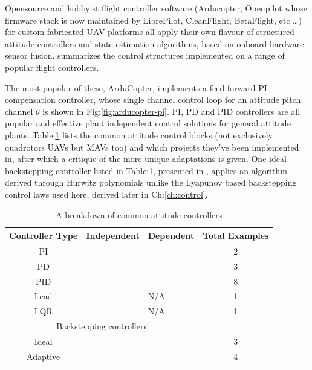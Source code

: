 \par
Opensource and hobbyist flight controller software (Arducopter\cite{arducoptersite}, Openpilot\cite{openpilotsite} whose firmware stack is now maintained by LibrePilot, CleanFlight\cite{cleanflight}, BetaFlight\cite{betaflight}, etc \ldots) for custom fabricated UAV platforms all apply their own flavour of structured attitude controllers and state estimation algorithms, based on onboard hardware sensor fusion. \cite{buildyourownquad} summarizes the control structures implemented on a range of popular flight controllers. 
\par
The most popular of these, ArduCopter, implements a feed-forward PI compensation controller, whose single channel control loop for an attitude pitch channel $\theta$ is shown in Fig:\ref{fig:arducopter-pi}.  PI, PD and PID controllers are all popular and effective plant independent control solutions for general attitude plants. Table:\ref{tab:controllers} lists the common attitude control blocks (not exclusively quadrotors UAVs but MAVs too) and which projects they've been implemented in, after which a critique of the more unique adaptations is given. One ideal backstepping controller listed in Table:\ref{tab:controllers}, presented in \cite{tpheonix}, applies an algorithm derived through Hurwitz polynomials unlike the Lyapunov based backstepping control laws used here, derived later in Ch:\ref{ch:control}.
\begin{table}[h]
\centering
\begin{tabular}{ |c|l|l|c| }
\hline
Controller Type & Independent & Dependent & Total Examples\\ \hline
PI & \cite{attitudecontrolproblem} & \cite{attitudecontrolproblem} & 2\\ \hline
PD & \cite{tiltrihani} & \cite{fullquaternion,singleaxistilting} & 3\\ \hline
PID & \cite{optimizedpidquadcopter, attitudecontrolproblem, quaddynamics, tiltpropellercontrol, pidlqr} & \cite{attitudecontrolproblem, starmac, adaptivedisturbancecontrol} & 8\\ \hline
Lead & \cite{x4flyer} & N/A & 1\\ \hline
LQR & \cite{pidlqr} & N/A & 1\\ 
\hline
\multicolumn{3}{|c|}{Backstepping controllers} & \\
\hline
Ideal & \cite{tpheonix, backsteppingquadcoptercontrol} & \cite{backsteppingquadcoptercontrol} & 3\\ \hline
Adaptive & \multicolumn{2}{l|}{\cite{adaptivebackstep, nonlinearadaptive, 6dofbackstep, intelligentbackstep}} & 4\\ \hline
\end{tabular}
\caption{A breakdown of common attitude controllers}
\label{tab:controllers}
\end{table}
